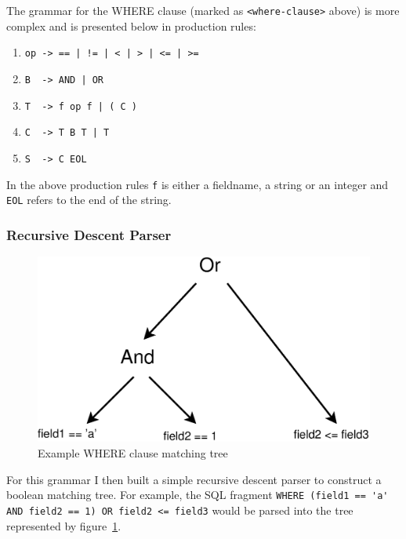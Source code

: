 \documentclass[12pt,twoside,notitlepage]{report}
\begin{document}
The grammar for the WHERE clause (marked as \verb+<where-clause>+ above) is more complex and
is presented below in production rules:
\begin{enumerate}
\item \verb+op -> == | != | < | > | <= | >=+
\item \verb+B  -> AND | OR+
\item \verb+T  -> f op f | ( C )+
\item \verb+C  -> T B T | T+
\item \verb+S  -> C EOL+
\end{enumerate}

In the above production rules \verb+f+ is either a fieldname, a string or an integer and \verb+EOL+
refers to the end of the string.

\subsubsection{Recursive Descent Parser}

\begin{figure}[Hhtb]
\centering
\includegraphics[scale=0.5]{figs/where-ast.eps}
\caption{\label{fig:where-ast}Example WHERE clause matching tree}
\end{figure}

For this grammar I then built a simple recursive descent parser to construct a boolean matching
tree. For example, the SQL fragment \verb+WHERE (field1 == 'a' AND field2 == 1) OR field2 <= field3+
would be parsed into the tree represented by figure~\ref{fig:where-ast}.

%
%
%
\end{document}

